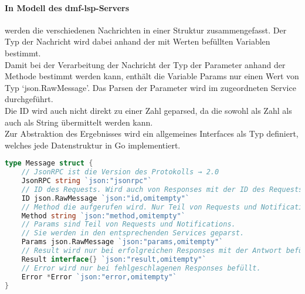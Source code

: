 \documentclass[./einleitung.tex]{subfiles}
\begin{document}
    \paragraph{In Modell des \acrshort{dmf}-\acrshort{lsp}-Servers} werden die verschiedenen Nachrichten in einer Struktur zusammengefasst.
    Der Typ der Nachricht wird dabei anhand der mit Werten befüllten Variablen bestimmt.\\
    Damit bei der Verarbeitung der Nachricht der Typ der Parameter anhand der Methode bestimmt werden kann, enthält die Variable Params nur einen Wert von Typ `json.RawMessage'.
    Das Parsen der Parameter wird im zugeordneten Service durchgeführt.\\
    Die ID wird auch nicht direkt zu einer Zahl geparsed, da die sowohl als Zahl als auch als String übermittelt werden kann.\\
    Zur Abstraktion des Ergebnisses wird ein allgemeines Interfaces als Typ definiert, welches jede Datenstruktur in Go implementiert.
    \begin{lstlisting}[language=Go, caption=Definition der Nachricht im Go-Modell, label=lst:messageGo]
type Message struct {
	// JsonRPC ist die Version des Protokolls → 2.0
	JsonRPC string `json:"jsonrpc"`
	// ID des Requests. Wird auch von Responses mit der ID des Requests befüllt.
	ID json.RawMessage `json:"id,omitempty"`
	// Method die aufgerufen wird. Nur Teil von Requests und Notifications.
	Method string `json:"method,omitempty"`
	// Params sind Teil von Requests und Notifications.
	// Sie werden in den entsprechenden Services geparst.
	Params json.RawMessage `json:"params,omitempty"`
	// Result wird nur bei erfolgreichen Responses mit der Antwort befüllt.
	Result interface{} `json:"result,omitempty"`
	// Error wird nur bei fehlgeschlagenen Responses befüllt.
	Error *Error `json:"error,omitempty"`
}
    \end{lstlisting}
\end{document}
